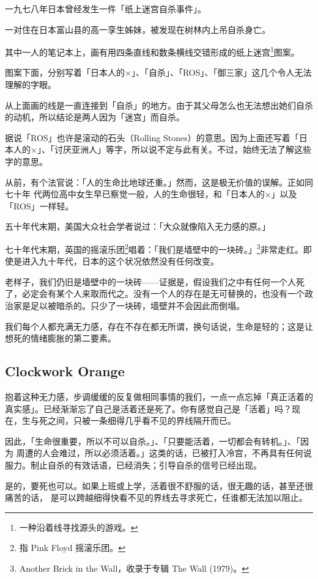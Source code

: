 \documentclass[UTF8]{ctexart}
\begin{document}
一九七八年日本曾经发生一件「纸上迷宫自杀事件」。

一对住在日本富山县的高一孪生姊妹，被发现在树林内上吊自杀身亡。

其中一人的笔记本上，画有用四条直线和数条横线交错形成的纸上迷宫\footnote{一种沿着线寻找源头的游戏。}图案。

图案下面，分别写着「日本人的×」、「自杀」、「ROS」、「御三家」这几个令人无法理解的字眼。

从上面画的线是一直连接到「自杀」的地方。由于其父母怎么也无法想出她们自杀的动机，所以结论是两人因为「迷宫」而自杀。

据说「ROS」也许是滚动的石头（Rolling Stones）的意思。因为上面还写着「日本人的×」、「讨厌亚洲人」等字，所以说不定与此有关。不过，始终无法了解这些字的意思。

从前，有个法官说：「人的生命比地球还重。」然而，这是极无价值的误解。正如同七十年 代两位高中女生早已察觉一般，人的生命很轻，和「日本人的×」以及「ROS」一样轻。

五十年代末期，美国大众社会学者说过：「大众就像陷入无力感的原。」

七十年代末期，英国的摇滚乐团\footnote{指 Pink Floyd 摇滚乐团。}唱着：「我们是墙壁中的一块砖。」\footnote{Another Brick in the Wall，收录于专辑 The Wall (1979)。}非常走红。即使是进入九十年代，日本的这个状况依然没有任何改变。

老样子，我们仍旧是墙壁中的一块砖——证据是，假设我们之中有任何一个人死了，必定会有某个人来取而代之。没有一个人的存在是无可替换的，也没有一个政治家是足以被暗杀的。只少了一块砖，墙壁并不会因此而倒塌。 

我们每个人都充满无力感，存在不存在都无所谓，换句话说，生命是轻的；这是让想死的情绪膨胀的第二要素。

\subsection{Clockwork Orange}

抱着这种无力感，步调缓缓的反复做相同事情的我们，一点一点忘掉「真正活着的真实感」。已经渐渐忘了自己是活着还是死了。你有感觉自己是「活着」吗？现在，生与死之间，只被一条细得几乎看不见的界线隔开而已。

因此，「生命很重要，所以不可以自杀。」、「只要能活着，一切都会有转机。」、「因为 周遭的人会难过，所以必须活着。」这类的话，已被打入冷宫，不再具有任何说服力。制止自杀的有效话语，已经消失；引导自杀的信号已经出现。

是的，要死也可以。如果上班或上学，活着很不舒服的话，很无趣的话，甚至还很痛苦的话， 是可以跨越细得快看不见的界线去寻求死亡，任谁都无法加以阻止。
\end{document}
